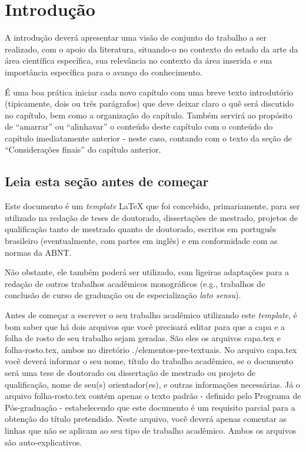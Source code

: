 
\chapter{Introdução}
\label{chap:introducao}

A introdução deverá apresentar uma visão de conjunto do trabalho a ser realizado, com o apoio da literatura, situando-o no contexto do estado da arte da área científica específica, sua relevância no contexto da área inserida e sua importância específica para o avanço do conhecimento.

É uma boa prática iniciar cada novo capítulo com uma breve texto introdutório (tipicamente, dois ou três parágrafos) que deve deixar claro o quê será discutido no capítulo, bem como a organização do capítulo.
Também servirá ao propósito de ``amarrar'' ou ``alinhavar'' o conteúdo deste capítulo com o conteúdo do capítulo imediatamente anterior - neste caso, contando com o texto da seção de ``Considerações finais'' do capítulo anterior.

\section{Leia esta seção antes de começar}
\label{sec:leia_esta_secao_antes_de_omeçar}

Este documento é um \emph{template} \LaTeX{} que foi concebido, primariamente, para ser utilizado na redação de teses de doutorado, dissertações de mestrado, projetos de qualificação tanto de mestrado quanto de doutorado, escritos em português brasileiro (eventualmente, com partes em inglês) e em conformidade com as normas da ABNT.

Não obstante, ele também poderá ser utilizado, com ligeiras adaptações para a redação de outros trabalhos acadêmicos monográficos (e.g., trabalhos de conclusão de curso de graduação ou de especialização \emph{lato sensu}).

Antes de começar a escrever o seu trabalho acadêmico utilizando este \emph{template}, é bom saber que há dois arquivos que você precisará editar para que a capa e a folha de rosto de seu trabalho sejam geradas.
São eles os arquivos {\ttfamily capa.tex} e {\ttfamily folha-rosto.tex}, ambos no diretório  {\ttfamily ./elementos-pre-textuais}.
No arquivo {\ttfamily capa.tex} você deverá informar o seu nome, título do trabalho acadêmico, se o documento será uma tese de doutorado ou dissertação de mestrado ou projeto de qualificação, nome de seu(s) orientador(es), e outras informações necessárias.
Já o arquivo {\ttfamily folha-rosto.tex} contém apenas o texto padrão - definido pelo Programa de Pós-graduação - estabelecendo que este documento é um requisito parcial para a obtenção do título pretendido.
Neste arquivo, você deverá apenas comentar as linhas que não se aplicam ao seu tipo de trabalho acadêmico.
Ambos os arquivos são auto-explicativos.

